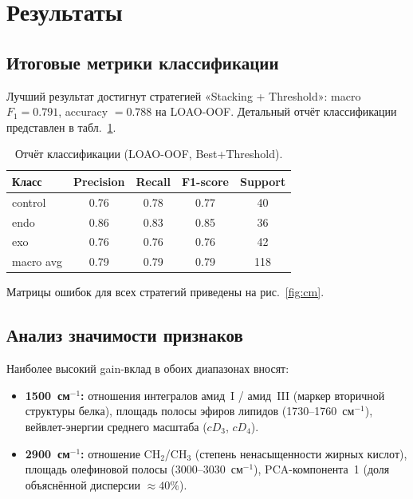 \documentclass[12pt, a4paper]{article}
\begin{document}
\section{Результаты}

\subsection{Итоговые метрики классификации}

Лучший результат достигнут стратегией «Stacking + Threshold»:
macro $F_1 = 0.791$, accuracy $= 0.788$ на LOAO-OOF.
Детальный отчёт классификации представлен в табл.~\ref{tab:clf_report}.

\begin{table}[H]
\centering
\caption{Отчёт классификации (LOAO-OOF, Best+Threshold).}
\label{tab:clf_report}
\begin{tabular}{lcccc}
\toprule
\textbf{Класс} & \textbf{Precision} & \textbf{Recall} &
\textbf{F1-score} & \textbf{Support} \\
\midrule
control  & 0.76 & 0.78 & 0.77 & 40 \\
endo     & 0.86 & 0.83 & 0.85 & 36 \\
exo      & 0.76 & 0.76 & 0.76 & 42 \\
\midrule
macro avg & 0.79 & 0.79 & 0.79 & 118 \\
\bottomrule
\end{tabular}
\end{table}

Матрицы ошибок для всех стратегий приведены на рис.~\ref{fig:cm}.

\subsection{Анализ значимости признаков}

Наиболее высокий gain-вклад в обоих диапазонах вносят:

\begin{itemize}[leftmargin=1.5cm]
  \item \textbf{1500~см$^{-1}$:} отношения интегралов амид~I / амид~III
        (маркер вторичной структуры белка), площадь полосы эфиров
        липидов (1730–1760~см$^{-1}$), вейвлет-энергии среднего
        масштаба ($cD_3$, $cD_4$).
  \item \textbf{2900~см$^{-1}$:} отношение CH$_2$/CH$_3$
        (степень ненасыщенности жирных кислот),
        площадь олефиновой полосы (3000–3030~см$^{-1}$),
        PCA-компонента~1 (доля объяснённой дисперсии $\approx 40\%$).
\end{itemize}
\end{document}

